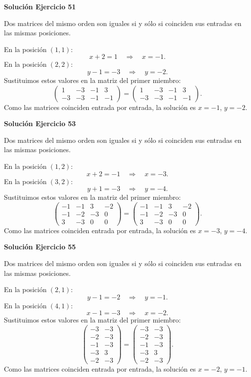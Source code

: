 \documentclass[12pt]{article}
\begin{document}
\par\bigskip\noindent\textbf{Solución Ejercicio 51}\par\nobreak
Dos matrices del mismo orden son iguales si y sólo si coinciden sus entradas en las mismas posiciones.

En la posición $(1,1)$:
\[
x + 2=1\quad\Longrightarrow\quad x=-1.
\]
En la posición $(2,2)$:
\[
y - 1=-3\quad\Longrightarrow\quad y=-2.
\]
Sustituimos estos valores en la matriz del primer miembro:
\[
\begin{pmatrix}1&-3&-1&3\\-3&-3&-1&-1\end{pmatrix}=\begin{pmatrix}1&-3&-1&3\\-3&-3&-1&-1\end{pmatrix}.
\]
Como las matrices coinciden entrada por entrada, la solución es $x=-1$, $y=-2$.


\par\bigskip\noindent\textbf{Solución Ejercicio 53}\par\nobreak
Dos matrices del mismo orden son iguales si y sólo si coinciden sus entradas en las mismas posiciones.

En la posición $(1,2)$:
\[
x + 2=-1\quad\Longrightarrow\quad x=-3.
\]
En la posición $(3,2)$:
\[
y + 1=-3\quad\Longrightarrow\quad y=-4.
\]
Sustituimos estos valores en la matriz del primer miembro:
\[
\begin{pmatrix}-1&-1&3&-2\\-1&-2&-3&0\\3&-3&0&0\end{pmatrix}=\begin{pmatrix}-1&-1&3&-2\\-1&-2&-3&0\\3&-3&0&0\end{pmatrix}.
\]
Como las matrices coinciden entrada por entrada, la solución es $x=-3$, $y=-4$.


\par\bigskip\noindent\textbf{Solución Ejercicio 55}\par\nobreak
Dos matrices del mismo orden son iguales si y sólo si coinciden sus entradas en las mismas posiciones.

En la posición $(2,1)$:
\[
y - 1=-2\quad\Longrightarrow\quad y=-1.
\]
En la posición $(4,1)$:
\[
x - 1=-3\quad\Longrightarrow\quad x=-2.
\]
Sustituimos estos valores en la matriz del primer miembro:
\[
\begin{pmatrix}-3&-3\\-2&-3\\-1&-3\\-3&3\\-2&-3\end{pmatrix}=\begin{pmatrix}-3&-3\\-2&-3\\-1&-3\\-3&3\\-2&-3\end{pmatrix}.
\]
Como las matrices coinciden entrada por entrada, la solución es $x=-2$, $y=-1$.
\end{document}
